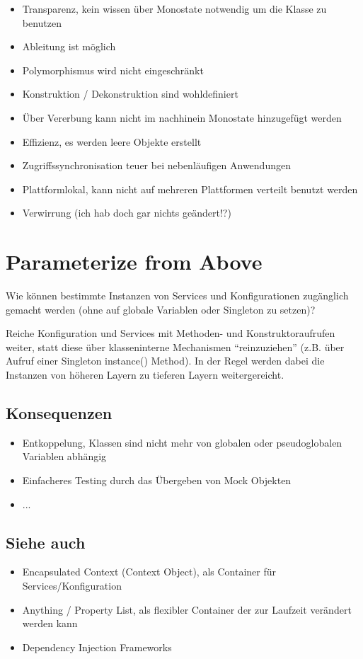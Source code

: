 \begin{itemize}
	\item Transparenz, kein wissen über Monostate notwendig um die Klasse zu benutzen
	\item Ableitung ist möglich
	\item Polymorphismus wird nicht eingeschränkt
	\item Konstruktion / Dekonstruktion sind wohldefiniert
	\item Über Vererbung kann nicht im nachhinein Monostate hinzugefügt werden
	\item Effizienz, es werden leere Objekte erstellt
	\item Zugriffssynchronisation teuer bei nebenläufigen Anwendungen
	\item Plattformlokal, kann nicht auf mehreren Plattformen verteilt benutzt werden
	\item Verwirrung (ich hab doch gar nichts geändert!?)
\end{itemize}

\section{Parameterize from Above}

Wie können bestimmte Instanzen von Services und Konfigurationen zugänglich gemacht werden (ohne auf globale Variablen oder Singleton zu setzen)?

Reiche Konfiguration und Services mit Methoden- und Konstruktoraufrufen weiter, statt diese über klasseninterne Mechanismen ``reinzuziehen'' (z.B. über Aufruf einer Singleton instance() Method). In der Regel werden dabei die Instanzen von höheren Layern zu tieferen Layern weitergereicht.

\subsection*{Konsequenzen}

\begin{itemize}
	\item Entkoppelung, Klassen sind nicht mehr von globalen oder pseudoglobalen Variablen abhängig
	\item Einfacheres Testing durch das Übergeben von Mock Objekten
	\item ...
\end{itemize}

\subsection*{Siehe auch}

\begin{itemize}
	\item Encapsulated Context (Context Object), als Container für Services/Konfiguration
	\item Anything / Property List, als flexibler Container der zur Laufzeit verändert werden kann
	\item Dependency Injection Frameworks
\end{itemize}